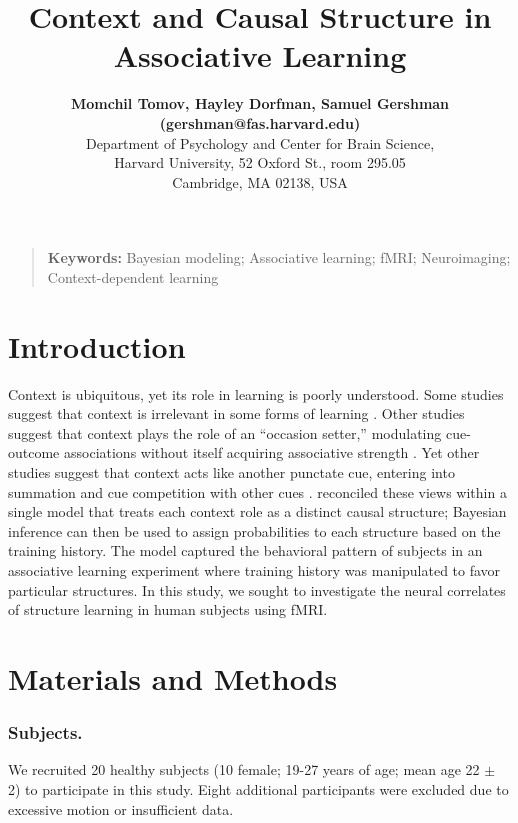 \documentclass[10pt,letterpaper]{article}
\title{Context and Causal Structure in Associative Learning}
\author{{\large \bf Momchil Tomov, Hayley Dorfman, Samuel Gershman (gershman@fas.harvard.edu)}  \\
  Department of Psychology and Center for Brain Science,\\
  Harvard University, 52 Oxford St., room 295.05\\
Cambridge, MA 02138, USA}
\begin{document}
\maketitle


\begin{quote}
\small
\textbf{Keywords:} 
Bayesian modeling; Associative learning; fMRI; Neuroimaging; Context-dependent learning
\end{quote}

\section{Introduction}


Context is ubiquitous, yet its role in learning is poorly understood. Some studies suggest that context is irrelevant in some forms of learning \cite{Kaye1987}. Other studies suggest that context plays the role of an ``occasion setter,'' modulating cue-outcome associations without itself acquiring associative strength \cite{Swartzentruber1995}. Yet other studies suggest that context acts like another punctate cue, entering into summation and cue competition with other cues \cite{Rescorla1984}.  reconciled these views within a single model that treats each context role as a distinct causal structure; Bayesian inference can then be used to assign probabilities to each structure based on the training history. The model captured the behavioral pattern of subjects in an associative learning experiment where training history was manipulated to favor particular structures. In this study, we sought to investigate the neural correlates of structure learning in human subjects using fMRI.

\section{Materials and Methods}

\subsubsection{Subjects.}

We recruited 20 healthy subjects (10 female; 19-27 years of age; mean age 22 $\pm$ 2) to participate in this study. Eight additional participants were excluded due to excessive motion or insufficient data.
\end{document}
